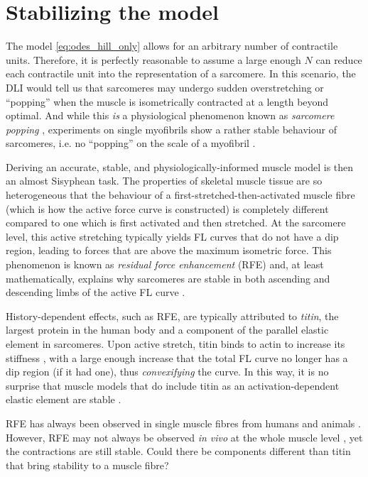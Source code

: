 \documentclass{sfuthesis}
\numberwithin{equation}{section}
\numberwithin{figure}{chapter}
\numberwithin{table}{chapter}
\theoremstyle{definition}
\begin{document}
\section{Stabilizing the model} \label{sec:stabilizing_the_model_ch3}

The model \eqref{eq:odes_hill_only} allows for an arbitrary number of contractile units. Therefore, it is perfectly reasonable to assume a large enough $N$ can reduce each contractile unit into the representation of a sarcomere. In this scenario, the DLI would tell us that sarcomeres may undergo sudden overstretching or ``popping'' when the muscle is isometrically contracted at a length beyond optimal. And while this \textit{is} a physiological phenomenon known as \textit{sarcomere popping} \cite{Morgan1990,MorganProske2004,MorganProske2006}, experiments on single myofibrils show a rather stable behaviour of sarcomeres, i.e. no ``popping'' on the scale of a myofibril \cite{JohnstonJinhaHerzog2016}.

Deriving an accurate, stable, and physiologically-informed muscle model is then an almost Sisyphean task. The properties of skeletal muscle tissue are so heterogeneous that the behaviour of a first-stretched-then-activated muscle fibre (which is how the active force curve is constructed) is completely different compared to one which is first activated and then stretched. At the sarcomere level, this active stretching typically yields FL curves that do not have a dip region, leading to forces that are above the maximum isometric force. This phenomenon is known as \textit{residual force enhancement} (RFE) and, at least mathematically, explains why sarcomeres are stable in both ascending and descending limbs of the active FL curve \cite{JoumaaLeonardHerzog2008}. 

History-dependent effects, such as RFE, are typically attributed to \textit{titin}, the largest protein in the human body and a component of the parallel elastic element in sarcomeres. Upon active stretch, titin binds to actin to increase its stiffness \cite{Nishikawa2020}, with a large enough increase that the total FL curve no longer has a dip region (if it had one), thus \textit{convexifying} the curve. In this way, it is no surprise that muscle models that do include titin as an activation-dependent elastic element are stable \cite{HeidlaufEtAl2016,HeidlaufEtAl2017,LemosEtAl2001,Millard2024,SampaioDeOliveiraUchida2025}. 

RFE has always been observed in single muscle fibres from humans and animals \cite{JoumaaLeonardHerzog2008, Pinnell2019,RassierPavlov2012}. However, RFE may not always be observed \textit{in vivo} at the whole muscle level \cite{Bakenecker2020,Chapman2018,Hinks2024}, yet the contractions are still stable. Could there be components different than titin that bring stability to a muscle fibre?
\end{document}
